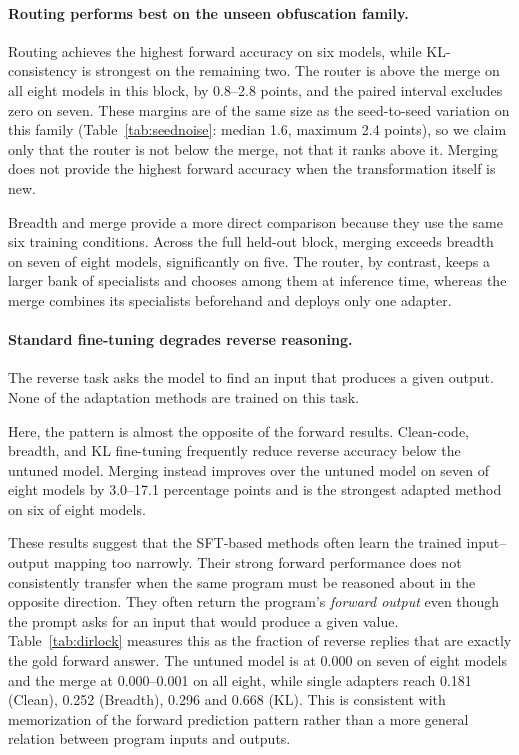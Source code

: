 \paragraph{Routing performs best on the unseen obfuscation family.}
Routing achieves the highest forward accuracy on six models, while
KL-consistency is strongest on the remaining two. The router is above the
merge on all eight models in this block, by 0.8--2.8 points, and the paired
interval excludes zero on seven. These margins are of the same size as the
seed-to-seed variation on this family (Table~\ref{tab:seednoise}: median 1.6,
maximum 2.4 points), so we claim only that the router is not below the merge,
not that it ranks above it. Merging does not provide the highest forward
accuracy when the transformation itself is new.

Breadth and merge provide a more direct comparison because they use the same
six training conditions. Across the full held-out block, merging exceeds
breadth on seven of eight models, significantly on five. The router, by contrast, keeps a larger bank
of specialists and chooses among them at inference time, whereas the merge
combines its specialists beforehand and deploys only one adapter.

\paragraph{Standard fine-tuning degrades reverse reasoning.}
The reverse task asks the model to find an input that produces a given output.
None of the adaptation methods are trained on this task.

Here, the pattern is almost the opposite of the forward results. Clean-code,
breadth, and KL fine-tuning frequently reduce reverse accuracy below the
untuned model. Merging instead improves over the untuned model on seven of
eight models by 3.0--17.1 percentage points and is the strongest adapted method
on six of eight models.

These results suggest that the SFT-based methods often learn the trained
input--output mapping too narrowly. Their strong forward performance does not
consistently transfer when the same program must be reasoned about in the
opposite direction. They often return the program's \emph{forward output} even
though the prompt asks for an input that would produce a given value.
Table~\ref{tab:dirlock} measures this as the fraction of reverse replies that
are exactly the gold forward answer. The untuned model is at 0.000 on seven of
eight models and the merge at 0.000--0.001 on all eight, while single adapters
reach 0.181 (Clean), 0.252 (Breadth), 0.296 and 0.668 (KL). This is
consistent with memorization of the forward prediction pattern rather than a
more general relation between program inputs and outputs.

